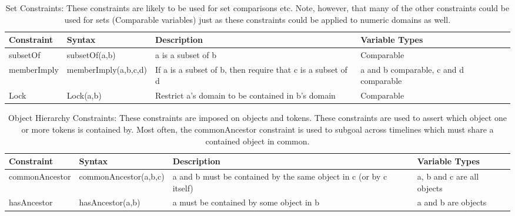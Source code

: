 \begin{table*}[ht]
  \centering
  \renewcommand{\arraystretch}{1.0}%
  \begin{tabular}{|l|l|p{7.5cm}|p{3cm}|}
    \hline
    \textbf{Constraint}& \textbf{Syntax}& \textbf{Description}& \textbf{Variable Types}\\
    \hline
    subsetOf& subsetOf(a,b)& a is a subset of b& Comparable\\
    \hline
    memberImply& memberImply(a,b,c,d)& If a is a subset of b, then require that c is a subset of d& a and b comparable, c and d comparable\\
    \hline
    Lock& Lock(a,b)& Restrict a's domain to be contained in b's domain& Comparable\\
    \hline
  \end{tabular}
  \caption{\small Set Constraints: These constraints are likely to be used for set comparisons etc. Note, however, that many of the other constraints could be used for sets (\ie Comparable variables) just as these constraints could be applied to numeric domains as well.}
  \label{tab:setconst}
\end{table*}


\begin{table*}[ht]
  \centering
  \renewcommand{\arraystretch}{1.0}%
  \begin{tabular}{|l|l|p{7cm}|p{3cm}|}
    \hline
    \textbf{Constraint}& \textbf{Syntax}& \textbf{Description}& \textbf{Variable Types}\\
    \hline
    commonAncestor& commonAncestor(a,b,c)& a and b must be contained by the same object in c (or by c itself)& a, b and c are all objects\\
    \hline
    hasAncestor& hasAncestor(a,b)& a must be contained by some object in b& a and b are objects\\
    \hline
  \end{tabular}
  \caption{\small Object Hierarchy Constraints: These constraints are imposed on objects and tokens. These constraints are used to assert which object one or more tokens is contained by. Most often, the commonAncestor constraint is used to subgoal across timelines which must share a contained object in common.}
  \label{tab:objhierarchy}
\end{table*}


